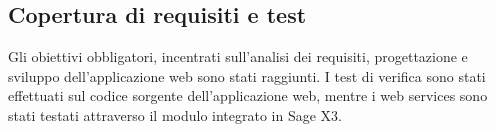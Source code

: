 
\subsection{Copertura di requisiti e test}

Gli obiettivi obbligatori, incentrati sull’analisi dei requisiti, progettazione e sviluppo dell’applicazione web sono stati raggiunti. I test di verifica sono stati effettuati sul codice sorgente dell’applicazione web, mentre i web services sono stati testati attraverso il modulo integrato in Sage X3.






